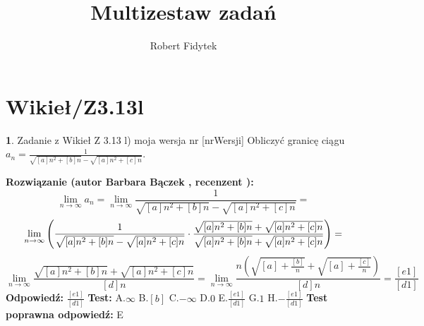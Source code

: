 \documentclass[12pt, a4paper]{article}
\title{Multizestaw zadań}
\author{Robert Fidytek}
\date{}
\theoremstyle{definition} %
\newtheorem{zad}{}
\newcommand{\kategoria}[1]{\section{#1}} %
\newcommand{\zadStart}[1]{\begin{zad}#1\newline} %
\newcommand{\zadStop}{\end{zad}}   %
\newcommand{\rozwStart}[2]{\noindent \textbf{Rozwiązanie (autor #1 , recenzent #2): }\newline} %
\newcommand{\rozwStop}{\newline}                                            %
\newcommand{\odpStart}{\noindent \textbf{Odpowiedź:}\newline}    %
\newcommand{\odpStop}{\newline}                                             %
\newcommand{\testStart}{\noindent \textbf{Test:}\newline} %
\newcommand{\testStop}{\newline} %
\newcommand{\kluczStart}{\noindent \textbf{Test poprawna odpowiedź:}\newline} %
\newcommand{\kluczStop}{\newline} %
\begin{document}
\maketitle


\kategoria{Wikieł/Z3.13l}
\zadStart{Zadanie z Wikieł Z 3.13 l) moja wersja nr [nrWersji]}
Obliczyć granicę ciągu $a_n= \frac{1}{\sqrt{[a]n^2+[b]n}- \sqrt{[a]n^2+[c]n}}$.
\zadStop
\rozwStart{Barbara Bączek}{}
$$\lim_{n \rightarrow \infty} a_n= \lim_{n \rightarrow \infty} \frac{1}{\sqrt{[a]n^2+[b]n}- \sqrt{[a]n^2+[c]n}}= $$
$$  \lim_{n \rightarrow \infty} \Bigg{(} \frac{1}{\sqrt{[a]n^2+[b]n}- \sqrt{[a]n^2+[c]n}} \cdot \frac{\sqrt{[a]n^2+[b]n} + \sqrt{[a]n^2+[c]n}}{\sqrt{[a]n^2+[b]n} + \sqrt{[a]n^2+[c]n}} \Bigg{)}=$$
$$\lim_{n \rightarrow \infty} \frac{\sqrt{[a]n^2+[b]n} + \sqrt{[a]n^2+[c]n}}{[d]n}=\lim_{n \rightarrow \infty} \frac{n(\sqrt{[a]+\frac{[b]}{n}} + \sqrt{[a]+\frac{[c]}{n}})}{[d]n}=   \frac{[e1]}{[d1]}$$
\rozwStop
\odpStart
$ \frac{[e1]}{[d1]}$
\odpStop
\testStart
A.$\infty$
B.$[b]$
C.$-\infty$
D.$0$
E.$ \frac{[e1]}{[d1]}$
G.$1$
H.$ -\frac{[e1]}{[d1]}$
\testStop
\kluczStart
E
\kluczStop
\end{document}
